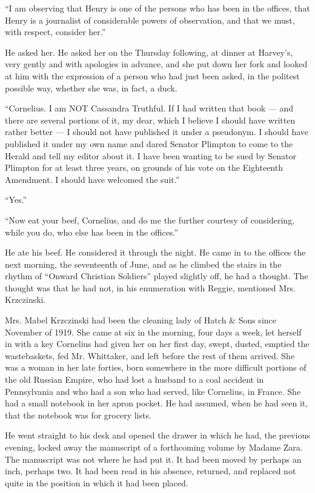 \documentclass[12pt,openright]{book}
\begin{document}
“I am observing that Henry is one of the persons who has been in the offices, that Henry is a journalist of considerable powers of observation, and that we must, with respect, consider her.”

He asked her. He asked her on the Thursday following, at dinner at Harvey’s, very gently and with apologies in advance, and she put down her fork and looked at him with the expression of a person who had just been asked, in the politest possible way, whether she was, in fact, a duck.

“Cornelius. I am NOT Cassandra Truthful. If I had written that book — and there are several portions of it, my dear, which I believe I should have written rather better — I should not have published it under a pseudonym. I should have published it under my own name and dared Senator Plimpton to come to the Herald and tell my editor about it. I have been wanting to be sued by Senator Plimpton for at least three years, on grounds of his vote on the Eighteenth Amendment. I should have welcomed the suit.”

“Yes.”

“Now eat your beef, Cornelius, and do me the further courtesy of considering, while you do, who else has been in the offices.”

He ate his beef. He considered it through the night. He came in to the offices the next morning, the seventeenth of June, and as he climbed the stairs in the rhythm of “Onward Christian Soldiers” played slightly off, he had a thought. The thought was that he had not, in his enumeration with Reggie, mentioned Mrs. Krzczinski.

Mrs. Mabel Krzczinski had been the cleaning lady of Hatch \& Sons since November of 1919. She came at six in the morning, four days a week, let herself in with a key Cornelius had given her on her first day, swept, dusted, emptied the wastebaskets, fed Mr. Whittaker, and left before the rest of them arrived. She was a woman in her late forties, born somewhere in the more difficult portions of the old Russian Empire, who had lost a husband to a coal accident in Pennsylvania and who had a son who had served, like Cornelius, in France. She had a small notebook in her apron pocket. He had assumed, when he had seen it, that the notebook was for grocery lists.

He went straight to his desk and opened the drawer in which he had, the previous evening, locked away the manuscript of a forthcoming volume by Madame Zara. The manuscript was not where he had put it. It had been moved by perhaps an inch, perhaps two. It had been read in his absence, returned, and replaced not quite in the position in which it had been placed.
\end{document}
